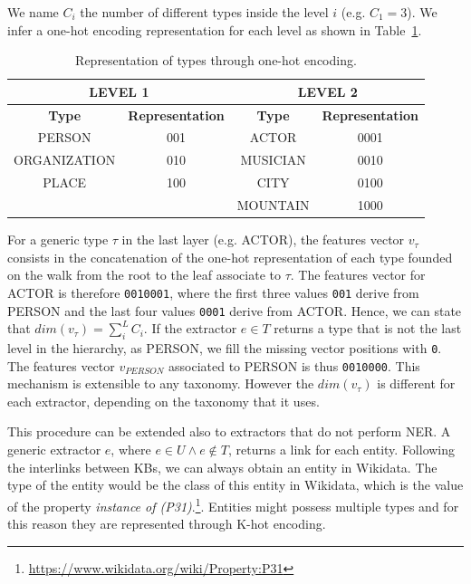 \documentclass{llncs}
\newcommand{\tabref}[1]{\mbox{Table~\ref{#1}}}
\begin{document}
We name $C_i$ the number of different types inside the level $i$ (e.g. $C_1 = 3$). We infer a one-hot encoding representation for each level as shown in \tabref{tab:onehottype}.

\begin{table}
\centering
\label{tab:onehottype}
\begin{tabular}{|c|c|c|c|}
\hline
\multicolumn{2}{|c|}{\textbf{LEVEL 1}} & \multicolumn{2}{|c|}{\textbf{LEVEL 2}} \\ \hline
\textbf{Type}  & \textbf{Representation}  & \textbf{Type}  & \textbf{Representation}    \\ \hline
PERSON          & 001   & ACTOR     & 0001  \\ \hline
ORGANIZATION    & 010   & MUSICIAN  & 0010  \\ \hline
PLACE           & 100   & CITY      & 0100  \\ \hline
      &       & MOUNTAIN  & 1000  \\ \hline
\end{tabular}
\bigskip
\caption{Representation of types through one-hot encoding.}
\end{table}

For a generic type $\tau$ in the last layer (e.g. ACTOR), the features vector $v_{\tau}$ consists in the concatenation of the one-hot representation of each type founded on the walk from the root to the leaf associate to $\tau$. The features vector for ACTOR is therefore  \texttt{0010001}, where the first three values \texttt{001} derive from PERSON and the last four values \texttt{0001} derive from ACTOR. Hence, we can state that $dim(v_{\tau})= \sum_{i}^{L}C_i$. If the extractor $e \in T$ returns a type that is not the last level in the hierarchy, as PERSON, we fill the missing vector positions with \texttt{0}. The features vector $v_{PERSON}$ associated to PERSON is thus \texttt{0010000}. This mechanism is extensible to any taxonomy. However the $dim(v_{\tau})$ is different for each extractor, depending on the taxonomy that it uses. 

This procedure can be extended also to extractors that do not perform NER. A generic extractor $e$, where $e \in U \wedge e \not\in T$, returns a link for each entity. Following the interlinks between KBs, we can always obtain an entity in Wikidata. The type of the entity would be the class of this entity in Wikidata, which is the value of the property \textit{instance of (P31)}.\footnote{\label{P31} \url{https://www.wikidata.org/wiki/Property:P31}}. Entities might possess multiple types and for this reason they are represented through K-hot encoding.
\end{document}
